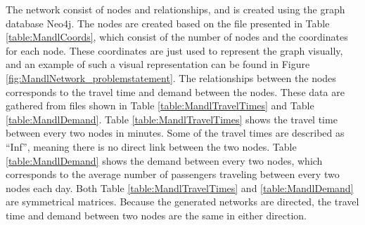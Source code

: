 The network consist of nodes and relationships, and is created using the graph database Neo4j. The nodes are created based on the file presented in Table \vref{table:MandlCoords}, which consist of the number of nodes and the coordinates for each node. These coordinates are just used to represent the graph visually, and an example of such a visual representation can be found in Figure \vref{fig:MandlNetwork_problemstatement}. The relationships between the nodes corresponds to the travel time and demand between the nodes. These data are gathered from files shown in Table \vref{table:MandlTravelTimes} and Table \vref{table:MandlDemand}. Table \ref{table:MandlTravelTimes} shows the travel time between every two nodes in minutes. Some of the travel times are described as ``Inf'', meaning there is no direct link between the two nodes. Table \ref{table:MandlDemand} shows the demand between every two nodes, which corresponds to the average number of passengers traveling between every two nodes each day. Both Table \ref{table:MandlTravelTimes} and \ref{table:MandlDemand} are symmetrical matrices. Because the generated networks are directed, the travel time and demand between two nodes are the same in either direction. 





